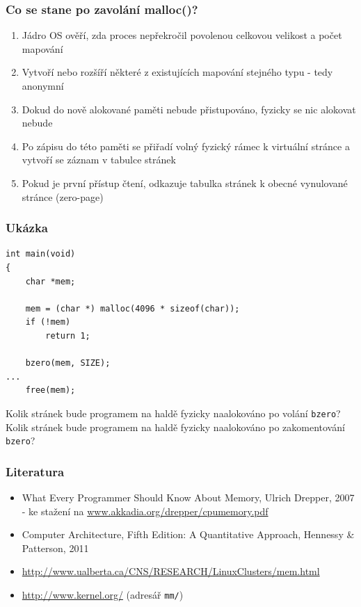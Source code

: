 \documentclass[professionalfonts,svgnames]{beamer}
\begin{document}
 \begin{frame}
\frametitle{Co se stane po zavolání malloc()?}
\begin{enumerate}
\item Jádro OS ověří, zda proces nepřekročil povolenou celkovou velikost a počet mapování
\item Vytvoří nebo rozšíří některé z existujících mapování stejného typu - tedy anonymní
\item Dokud do nově alokované paměti nebude přistupováno, fyzicky se nic alokovat nebude
\item Po zápisu do této paměti se přiřadí volný fyzický rámec k virtuální stránce a vytvoří se záznam v tabulce stránek
\item Pokud je první přístup čtení, odkazuje tabulka stránek k obecné vynulované stránce (zero-page)
\end{enumerate}
\end{frame}

\begin{frame}[fragile]
\frametitle{Ukázka}
\begin{verbatim}
int main(void)
{
	char *mem;

	mem = (char *) malloc(4096 * sizeof(char));
	if (!mem)
		return 1;

	bzero(mem, SIZE);
...
	free(mem);
\end{verbatim}
Kolik stránek bude programem na haldě fyzicky naalokováno po volání \texttt{bzero}?
Kolik stránek bude programem na haldě fyzicky naalokováno po zakomentování \texttt{bzero}?
\end{frame}

 \begin{frame}
\frametitle{Literatura}
\begin{itemize}
\item What Every Programmer Should Know About Memory, Ulrich Drepper, 2007 - ke stažení na \url{www.akkadia.org/drepper/cpumemory.pdf}
\item Computer Architecture, Fifth Edition: A Quantitative Approach,  Hennessy \& Patterson, 2011
\item \url{http://www.ualberta.ca/CNS/RESEARCH/LinuxClusters/mem.html}
\item \url{http://www.kernel.org/} (adresář \texttt{mm/})
\end{itemize}
\end{frame}
\end{document}
